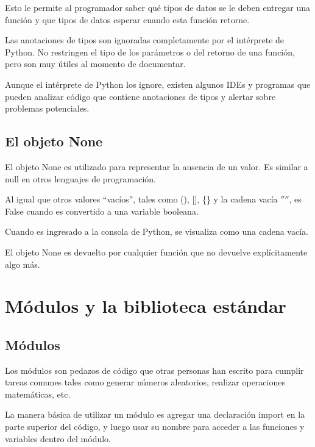 \documentclass{report}
\newcommand{\doble}[1]{``#1''}
\begin{document}
Esto le permite al programador saber qué tipos de datos se le deben entregar una función y que tipos de datos esperar cuando esta función retorne.\smallskip

Las anotaciones de tipos son ignoradas completamente por el intérprete de Python. No restringen el tipo de los parámetros o del retorno de una función, pero son muy útiles al momento de documentar.


Aunque el intérprete de Python los ignore, existen algunos IDEs y programas que pueden analizar código que contiene anotaciones de tipos y alertar sobre problemas potenciales.

\section{El objeto None}

El objeto None es utilizado para representar la ausencia de un valor. Es similar a null en otros lenguajes de programación.\smallskip

Al igual que otros valores \doble{vacíos}, tales como (), [], \{\} y la cadena vacía $''$$''$, es False cuando es convertido a una variable booleana.


Cuando es ingresado a la consola de Python, se visualiza como una cadena vacía.


El objeto None es devuelto por cualquier función que no devuelve explícitamente algo más.


\clearpage\chapter{Módulos y la biblioteca estándar}

\section{Módulos}

Los módulos son pedazos de código que otras personas han escrito para cumplir tareas comunes tales como generar números aleatorios, realizar operaciones matemáticas, etc.\smallskip

La manera básica de utilizar un módulo es agregar una declaración import en la parte superior del código, y luego usar su nombre para acceder a las funciones y variables dentro del módulo.
\end{document}
